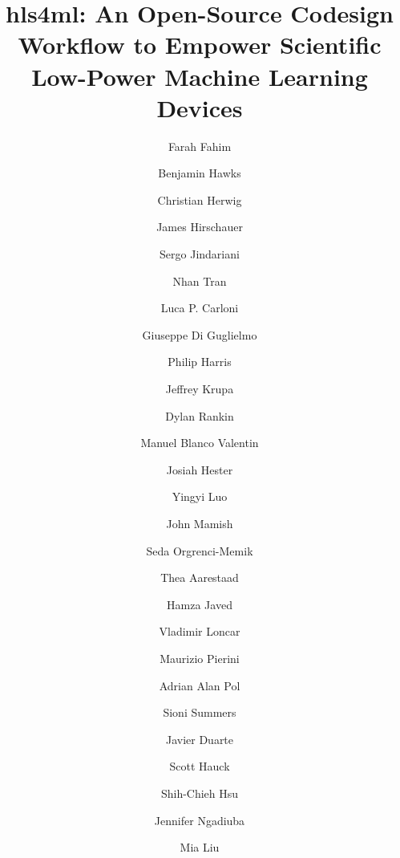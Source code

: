 \documentclass[tinyml]{acmart}
\begin{document}
\title{hls4ml: An Open-Source Codesign Workflow to Empower Scientific Low-Power Machine Learning Devices}


\author{Farah Fahim}
\author{Benjamin Hawks}
 \author{Christian Herwig}
 \author{James Hirschauer}
 \author{Sergo Jindariani}
 \author{Nhan Tran}
 \authornotemark[1]

 \author{Luca P. Carloni}
 \author{Giuseppe Di Guglielmo}

 \author{Philip Harris}
 \author{Jeffrey Krupa}
 \author{Dylan Rankin}

 \author{Manuel Blanco Valentin}
 \author{Josiah Hester}
 \author{Yingyi Luo}
 \author{John Mamish}
 \author{Seda Orgrenci-Memik}

 \author{Thea Aarestaad}
 \author{Hamza Javed}
 \author{Vladimir Loncar}
 \author{Maurizio Pierini}
 \author{Adrian Alan Pol}
 \author{Sioni Summers}

 \author{Javier Duarte}

 \author{Scott Hauck}
 \author{Shih-Chieh Hsu}

 \author{Jennifer Ngadiuba}

\author{Mia Liu}
\end{document}
